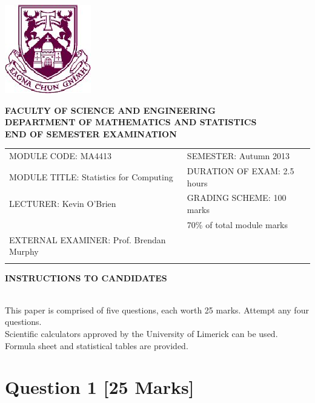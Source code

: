 \documentclass[a4paper,12pt]{article}
\begin{document}
\begin{center}
       \includegraphics[scale=0.60]{shieldtransparent2}
\end{center}

\begin{center}
\vspace{1cm}
\large \bf {FACULTY OF SCIENCE AND ENGINEERING} \\[0.5cm]
\normalsize DEPARTMENT OF MATHEMATICS AND STATISTICS \\[1.25cm]
\large \bf {END OF SEMESTER EXAMINATION} \\[1.5cm]
\end{center}

\begin{tabular}{ll}
MODULE CODE: MA4413 & SEMESTER: Autumn 2013\\[1cm]
MODULE TITLE: Statistics for Computing & DURATION OF EXAM: 2.5 hours \\[1cm]
LECTURER: Kevin O'Brien & GRADING SCHEME: 100 marks\\
 & \phantom{GRADING SCHEME:} \footnotesize {70\% of total module marks}   \\[0.8cm]
EXTERNAL EXAMINER: Prof. Brendan Murphy & \\[1cm]
\\[1cm]
\end{tabular}
\begin{center}
{\bf INSTRUCTIONS TO CANDIDATES}
\end{center}

{\noindent \\ This paper is comprised of five questions, each worth 25 marks. Attempt any four questions.
\\ Scientific calculators approved by the University of Limerick can be used. 
\\ Formula sheet and statistical tables are provided.
}
\normalsize
\newpage

\section*{Question 1 [25 Marks]}
\end{document}
